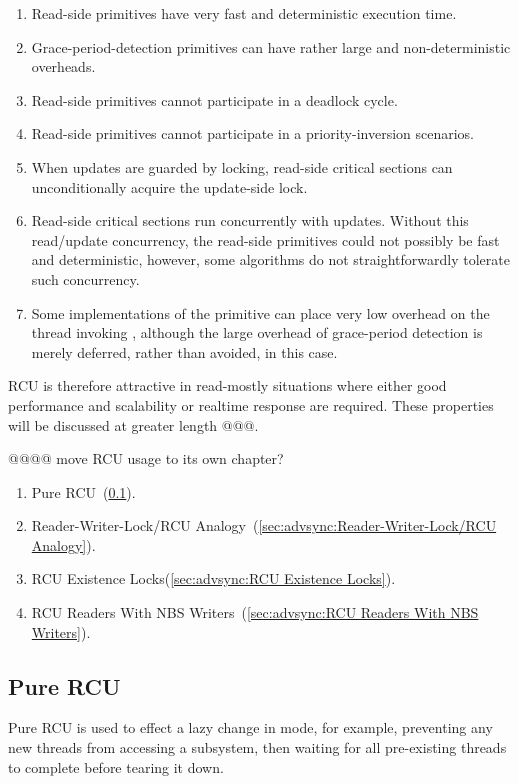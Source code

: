 \begin{enumerate}
\item	Read-side primitives have very fast and deterministic
	execution time.
\item	Grace-period-detection primitives can have rather large
	and non-deterministic overheads.
\item	Read-side primitives cannot participate in a deadlock cycle.
\item	Read-side primitives cannot participate in a priority-inversion
	scenarios.
\item	When updates are guarded by locking, read-side critical
	sections can unconditionally acquire the update-side lock.
\item	Read-side critical sections run concurrently with updates.
	Without this read/update concurrency, the read-side primitives could
	not possibly be fast and deterministic, however, some algorithms
	do not straightforwardly tolerate such concurrency.
\item	Some implementations of the  primitive
	can place very low overhead on the thread invoking
	, although the large overhead of grace-period
	detection is merely deferred, rather than avoided, in this
	case.
\end{enumerate}

RCU is therefore attractive in read-mostly situations where either
good performance and scalability or realtime response are required.
These properties will be discussed at greater length @@@.

@@@@ move RCU usage to its own chapter?

\begin{enumerate}
\item	Pure RCU~(\ref{sec:advsync:Pure RCU}).
\item	Reader-Writer-Lock/RCU
        Analogy~(\ref{sec:advsync:Reader-Writer-Lock/RCU Analogy}).
\item	RCU Existence Locks(\ref{sec:advsync:RCU Existence Locks}).
\item	RCU Readers With NBS
	Writers~(\ref{sec:advsync:RCU Readers With NBS Writers}).
\end{enumerate}

\subsection{Pure RCU}
\label{sec:advsync:Pure RCU}

Pure RCU is used to effect a lazy change in mode, for example, preventing
any new threads from accessing a subsystem, then waiting for all
pre-existing threads to complete before tearing it down.

